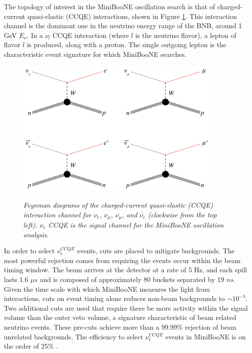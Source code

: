 The topology of interest in the MiniBooNE oscillation search is that of charged-current quasi-elastic (CCQE) interactions, shown in Figure \ref{georgia_ccqe_feynman_fig}. This interaction channel is the dominant one in the neutrino energy range of the BNB, around 1 GeV $E_\nu$. In a $\nu_l$ CCQE interaction (where $l$ is the neutrino flavor), a lepton of flavor $l$ is produced, along with a proton. The single outgoing lepton is the characteristic event signature for which MiniBooNE searches.\\


\begin{figure}[ht!]
\centering
	\includegraphics[width=0.9\textwidth]{Figures/georgia_ccqe_feynman.png} \\
\caption{\textit{Feynman diagrams of the charged-current quasi-elastic (CCQE) interaction channel for $\nu_e$, $\nu_\mu$, $\overline{\nu_\mu}$, and $\overline{\nu_e}$ (clockwise from the top left). $\nu_e$ CCQE is the signal channel for the MiniBooNE oscillation analysis.}}\label{georgia_ccqe_feynman_fig}
\end{figure}


In order to select $\nu_e^{CCQE}$ events, cuts are placed to mitigate backgrounds. The most powerful rejection comes from requiring the events occur within the beam timing window. The beam arrives at the detector at a rate of 5 Hz, and each spill lasts 1.6 $\mu s$ and is composed of approximately 80 buckets separated by 19 $ns$. Given the time scale with which MiniBooNE measures the light from interactions, cuts on event timing alone reduces non-beam backgrounds to $\sim10^{-3}$. Two additional cuts are used that require there be more activity within the signal volume than the outer veto volume, a signature characteristic of beam related neutrino events. These pre-cuts achieve more than a 99.99\% rejection of beam unrelated backgrounds. The efficiency to select $\nu_e^{CCQE}$ events in MiniBooNE is on the order of 25\% \cite{JocelynMonroeThesis}.\\

